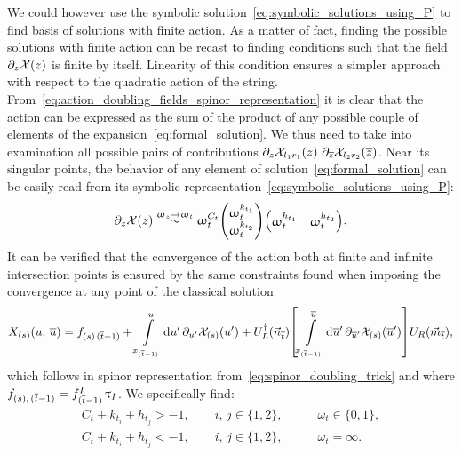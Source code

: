 We could however use the symbolic solution~\eqref{eq:symbolic_solutions_using_P} to find basis of solutions with finite action.
As a matter of fact, finding the possible solutions with finite action can be recast to finding conditions such that the field $\partial_{z} \mathcal{X}(z)$ is finite by itself.
Linearity of this condition ensures a simpler approach with respect to the quadratic action of the string.
From~\eqref{eq:action_doubling_fields_spinor_representation} it is clear that the action can be expressed as the sum of the product of any possible couple of elements of the expansion~\eqref{eq:formal_solution}.
We thus need to take into examination all possible pairs of contributions $\partial_{z} \mathcal{X}_{l_1 r_1}(z)~ \partial_{\overline{z}} \mathcal{X}_{l_2 r_2}(\overline{z})$.
Near its singular points, the behavior of any element of solution~\eqref{eq:formal_solution} can be easily read from its symbolic representation~\eqref{eq:symbolic_solutions_using_P}:
\begin{equation}
  \ipd{z} \cX(z)
  \stackrel{\omega_z \to \omega_t}{\sim}
  \omega_t^{C_t}
  \mqty( \omega_t^{k_{t_1}} \\ \omega_t^{k_{t_2}} )
  \mqty( \omega_t^{h_{t_1}} & \omega_t^{h_{t_2}} ).
\end{equation}
It can be verified that the convergence of the action both at finite and infinite intersection points is ensured by the same constraints found when imposing the convergence at any point of the classical solution
\begin{equation}
  X_{(s)}(u,\, \baru)
  =
  f_{(s)\, (\bart-1)}
  +
  \finiteint{u'}{x_{(\bart-1)}}{u}
  \ipd{u'} \cX_{(s)}(u')
  +
  U_L^{\dagger}(\vec{n}_{{\bart}})
  \qty[
    \finiteint{\baru'}{x_{(\bart-1)}}{\baru}
    \ipd{\baru'} \cX_{(s)}(\baru')
  ]
  U_R(\vec{m}_{{\bart}}),
  \label{eq:classical_solution}
\end{equation}
which follows in spinor representation from~\eqref{eq:spinor_doubling_trick} and where $f_{(s),\, (\overline{t}-1)} = f^I_{(\overline{t}-1)}\, \uptau_I$.
We specifically find:
\begin{equation}
  \begin{split}
    C_t + k_{t_i} + h_{t_j} > -1,
    \qquad
    i,\, j \in \{1,2\},
    & \qquad
    \omega_t \in \{0, 1\},
    \\
    C_t + k_{t_i} + h_{t_j} < -1,
    \qquad
    i,\, j \in \{1,2\},
    & \qquad
    \omega_t = \infty.
  \end{split}
  \label{eq:constraints_finite_X}
\end{equation}

